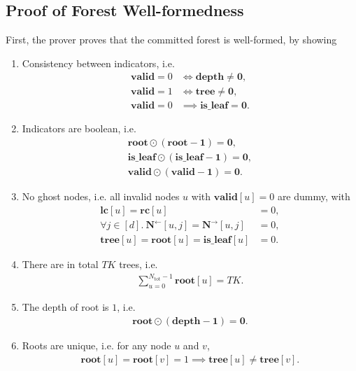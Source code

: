 \subsection{Proof of Forest Well-formedness}\label{subsec:proof of well-formedness}

First, the prover proves that the committed forest is well-formed, by showing
\begin{enumerate}
  \item Consistency between indicators, i.e.
  \begin{align}
    \mathbf{valid}=0 &\iff \mathbf{depth} \neq \mathbf{0},\\
    \mathbf{valid}=1 &\iff \mathbf{tree} \neq \mathbf{0},\\
    \mathbf{valid}=0 &\implies \mathbf{is\_leaf} = \mathbf{0}.
  \end{align}

  \item Indicators are boolean, i.e.
  \begin{align}
    \mathbf{root}\odot(\mathbf{root}-\mathbf{1}) = \mathbf{0},\\
    \mathbf{is\_leaf}\odot(\mathbf{is\_leaf}-\mathbf{1}) = \mathbf{0},\\
    \mathbf{valid}\odot(\mathbf{valid}-\mathbf{1}) = \mathbf{0}.
  \end{align}

  \item No ghost nodes, i.e. all invalid nodes $u$ with $\mathbf{valid}[u]=0$ are dummy, with
    \begin{align}
    \mathbf{lc}[u] = \mathbf{rc}[u] &= 0,\\
    \forall j\in [d].\ \mathbf{N}^{\leftarrow}[u, j] = \mathbf{N}^{\rightarrow}[u, j] &= 0,\\
    \mathbf{tree}[u] = \mathbf{root}[u] = \mathbf{is\_leaf}[u] &= 0.
    \end{align}

  \item There are in total $TK$ trees, i.e.
  \begin{align}
    \sum_{u=0}^{N_{\mathrm{tot}}-1} \mathbf{root}[u] = TK.
  \end{align}

  \item The depth of root is $1$, i.e.
  \begin{align}
    \mathbf{root}\odot (\mathbf{depth}-\mathbf{1}) = \mathbf{0}.
  \end{align}

  \item Roots are unique, i.e. for any node $u$ and $v$,
  \begin{align}
    \mathbf{root}[u] = \mathbf{root}[v] = 1\implies \mathbf{tree}[u]\neq \mathbf{tree}[v].
  \end{align}


\end{enumerate}

